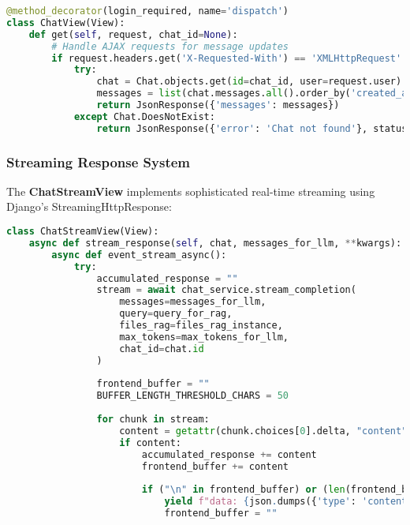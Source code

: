 \documentclass[12pt,a4paper]{article}
\begin{document}
\begin{lstlisting}[language=Python, caption=ChatView Core Logic]
@method_decorator(login_required, name='dispatch')
class ChatView(View):
    def get(self, request, chat_id=None):
        # Handle AJAX requests for message updates
        if request.headers.get('X-Requested-With') == 'XMLHttpRequest' and chat_id:
            try:
                chat = Chat.objects.get(id=chat_id, user=request.user)
                messages = list(chat.messages.all().order_by('created_at').values('role', 'content'))
                return JsonResponse({'messages': messages})
            except Chat.DoesNotExist:
                return JsonResponse({'error': 'Chat not found'}, status=404)
\end{lstlisting}

\subsubsection{Streaming Response System}

The \textbf{ChatStreamView} implements sophisticated real-time streaming using Django's StreamingHttpResponse:

\begin{lstlisting}[language=Python, caption=Streaming Implementation Core]
class ChatStreamView(View):
    async def stream_response(self, chat, messages_for_llm, **kwargs):
        async def event_stream_async():
            try:
                accumulated_response = ""
                stream = await chat_service.stream_completion(
                    messages=messages_for_llm, 
                    query=query_for_rag,
                    files_rag=files_rag_instance,
                    max_tokens=max_tokens_for_llm,
                    chat_id=chat.id
                )
                
                frontend_buffer = ""
                BUFFER_LENGTH_THRESHOLD_CHARS = 50
                
                for chunk in stream:
                    content = getattr(chunk.choices[0].delta, "content", None)
                    if content:
                        accumulated_response += content
                        frontend_buffer += content
                        
                        if ("\n" in frontend_buffer) or (len(frontend_buffer) >= BUFFER_LENGTH_THRESHOLD_CHARS):
                            yield f"data: {json.dumps({'type': 'content', 'content': frontend_buffer})}\n\n"
                            frontend_buffer = ""
\end{lstlisting}
\end{document}
